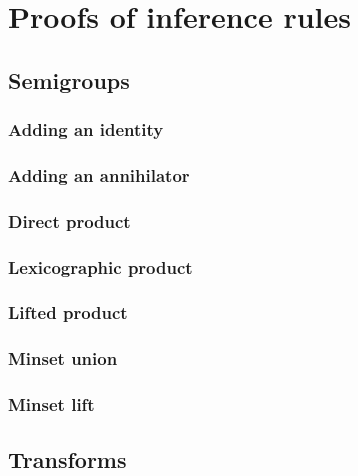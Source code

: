 \documentclass[10pt]{article}
\begin{document}
\section{Proofs of inference rules}
\label{sec:proofs} 
 

\subsection{Semigroups} 
\label{sec:semigroups:proofs} 
\subsubsection{Adding an identity} 
\label{sec:addid:proofs} 
 
\subsubsection{Adding an annihilator} 
\label{sec:addann:proofs} 
 
\subsubsection{Direct product} 
\label{sec:product:proofs} 
 
\subsubsection{Lexicographic product} 
\label{sec:llex:proofs} 
 
\subsubsection{Lifted product} 
\label{sec:lift:proofs} 
 
\subsubsection{Minset union} 
\label{sec:minsetunion:proofs} 
 
\subsubsection{Minset lift} 
\label{sec:minsetlift:proofs} 
 

\subsection{Transforms} 
\label{sec:transforms:proofs} 
\end{document}
